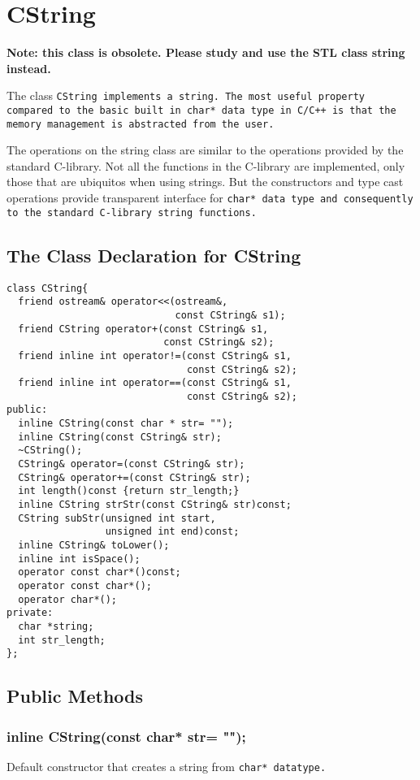 \section{CString}
\bf Note: \rm this class is obsolete. Please study and use the STL
class string instead. \linebreak

The class \tt CString \rm implements a string. The most
useful property compared to the basic built in \tt char* \rm
data type in C/C++ is that the memory management is abstracted 
from the user.

The  operations on  the  string  class  are similar  to the operations
provided by the standard  C-library. Not all the functions in the C-library
are implemented, only those that are ubiquitos when using 
strings. But the constructors  and  type cast
operations  provide transparent interface for \tt char* \rm data
type and consequently to the standard C-library string functions. 

\subsection{The Class Declaration for CString}
\begin{verbatim}
class CString{
  friend ostream& operator<<(ostream&,
                             const CString& s1);
  friend CString operator+(const CString& s1, 
                           const CString& s2);
  friend inline int operator!=(const CString& s1, 
                               const CString& s2);
  friend inline int operator==(const CString& s1, 
                               const CString& s2);
public:
  inline CString(const char * str= "");
  inline CString(const CString& str);
  ~CString();
  CString& operator=(const CString& str);
  CString& operator+=(const CString& str);
  int length()const {return str_length;}
  inline CString strStr(const CString& str)const;
  CString subStr(unsigned int start, 
                 unsigned int end)const;
  inline CString& toLower();
  inline int isSpace();
  operator const char*()const;
  operator const char*();
  operator char*();
private:
  char *string;
  int str_length;
};
\end{verbatim}

\subsection{Public Methods}

\subsubsection{inline CString(const char* str= "");}
Default constructor that creates a string from \tt char* \rm datatype. 

